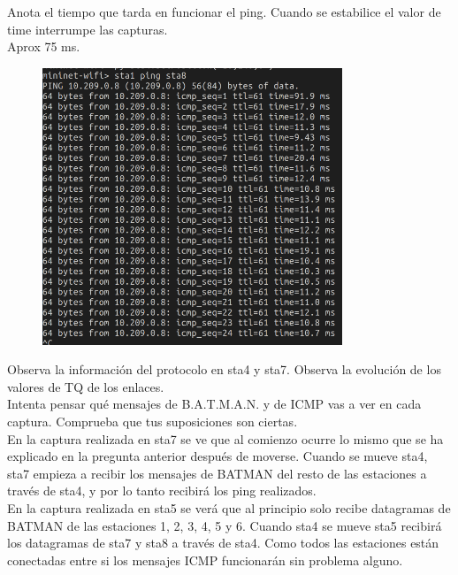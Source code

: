 \documentclass[12pt, a4paper]{report}
\begin{document}
\begin{enumerate}
	Anota el tiempo que tarda en funcionar el ping. Cuando se estabilice el valor de time interrumpe
	las capturas.\\
	
	Aprox 75 ms.
	\begin{figure}[H]
		\centering
		\includegraphics[width=0.8\textwidth]{ej3.2}
	\end{figure}
	
	Observa la información del protocolo en sta4 y sta7. Observa la evolución de los valores de TQ
	de los enlaces.\\
	
	Intenta pensar qué mensajes de B.A.T.M.A.N. y de ICMP vas a ver en cada captura. Comprueba
	que tus suposiciones son ciertas.\\
	
	En la captura realizada en sta7 se ve que al comienzo ocurre lo mismo que se ha explicado en la pregunta anterior después de moverse. Cuando se mueve sta4, sta7 empieza a recibir los mensajes de BATMAN del resto de las estaciones a través de sta4, y por lo tanto recibirá los ping realizados.\\
	
	En la captura realizada en sta5 se verá que al principio solo recibe datagramas de BATMAN de las estaciones 1, 2, 3, 4, 5 y 6. Cuando sta4 se mueve sta5 recibirá los datagramas de sta7 y sta8 a través de sta4. Como todos las estaciones están conectadas entre si los mensajes ICMP funcionarán sin problema alguno.
\end{enumerate}
\end{document}
